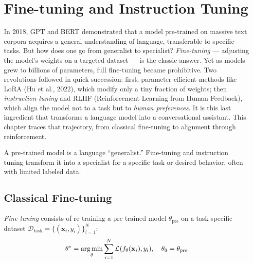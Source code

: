 \chapter{Fine-tuning and Instruction Tuning}
\label{ch:finetuning}

In 2018, GPT and BERT demonstrated that a model pre-trained on massive text corpora acquires a general understanding of language, transferable to specific tasks. But how does one go from generalist to specialist? \emph{Fine-tuning} --- adjusting the model's weights on a targeted dataset --- is the classic answer. Yet as models grew to billions of parameters, full fine-tuning became prohibitive. Two revolutions followed in quick succession: first, parameter-efficient methods like LoRA (Hu et al., 2022), which modify only a tiny fraction of weights; then \emph{instruction tuning} and RLHF (Reinforcement Learning from Human Feedback), which align the model not to a task but to \emph{human preferences}. It is this last ingredient that transforms a language model into a conversational assistant. This chapter traces that trajectory, from classical fine-tuning to alignment through reinforcement.

\begin{intuition}[title=\textbf{Adapting a generalist model}]
A pre-trained model is a language ``generalist.'' Fine-tuning and instruction
tuning transform it into a specialist for a specific task or desired behavior,
often with limited labeled data.
\end{intuition}

\section{Classical Fine-tuning}
\label{sec:ft:classical}

\begin{definition}
\emph{Fine-tuning} consists of re-training a pre-trained model
$\theta_{\text{pre}}$ on a task-specific dataset
$\mathcal{D}_{\text{task}} = \{(\mathbf{x}_i, y_i)\}_{i=1}^{N}$:
\[
\theta^* = \operatorname*{arg\,min}_\theta \sum_{i=1}^{N} \mathcal{L}(f_\theta(\mathbf{x}_i), y_i), \quad \theta_0 = \theta_{\text{pre}}
\]
\end{definition}

